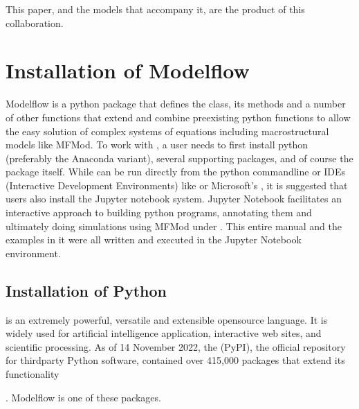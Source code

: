 \documentclass[letterpaper,10pt,english]{jupyterBook}
\begin{document}
\sphinxAtStartPar
This paper, and the models that accompany it, are the product of this collaboration.

\sphinxstepscope


\chapter{Installation of Modelflow}
\label{\detokenize{content/03_Installation/InstallingPython:installation-of-modelflow}}\label{\detokenize{content/03_Installation/InstallingPython::doc}}
\sphinxAtStartPar
Modelflow is a python package that defines the  class, its methods and a number of other functions that extend and combine pre\sphinxhyphen{}existing python functions to allow the easy solution of complex systems of equations including macro\sphinxhyphen{}structural models like MFMod.  To work with , a user needs to first install python (preferably the Anaconda variant), several supporting packages, and of course the  package itself.  While  can be run directly from the python command\sphinxhyphen{}line or IDEs (Interactive Development Environments) like  or Microsoft’s , it is suggested that users also install the Jupyter notebook system. Jupyter Notebook facilitates an interactive approach to building python programs, annotating them and ultimately doing simulations using MFMod under . This entire manual and the examples in it were all written and executed in the Jupyter Notebook environment.


\section{Installation of Python}
\label{\detokenize{content/03_Installation/InstallingPython:installation-of-python}}
\sphinxAtStartPar
{} is an extremely powerful, versatile and extensible open\sphinxhyphen{}source language. It is widely used for artificial intelligence application, interactive web sites, and scientific processing. As of 14 November 2022, the  (PyPI), the official repository for third\sphinxhyphen{}party Python software, contained over 415,000 packages that extend its functionality %
\begin{footnote}[1]\sphinxAtStartFootnote
{}
%
\end{footnote}. Modelflow is one of these packages.
\end{document}
